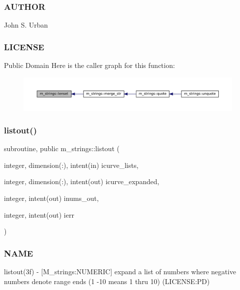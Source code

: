 \subsubsection*{A\+U\+T\+H\+OR}

John S. Urban \subsubsection*{L\+I\+C\+E\+N\+SE}

Public Domain Here is the caller graph for this function\+:
\nopagebreak
\begin{figure}[H]
\begin{center}
\leavevmode
\includegraphics[width=350pt]{namespacem__strings_a378563bb49f128bf0cf9c9d2b1f34498_icgraph}
\end{center}
\end{figure}
\mbox{\label{namespacem__strings_a81b4b7f4f301b9e17604adbcace58d0c}} 
\subsubsection{\texorpdfstring{listout()}{listout()}}
{\footnotesize\ttfamily subroutine, public m\+\_\+strings\+::listout (\begin{DoxyParamCaption}\item[{integer, dimension(\+:), intent(in)}]{icurve\+\_\+lists,  }\item[{integer, dimension(\+:), intent(out)}]{icurve\+\_\+expanded,  }\item[{integer, intent(out)}]{inums\+\_\+out,  }\item[{integer, intent(out)}]{ierr }\end{DoxyParamCaption})}



\subsubsection*{N\+A\+ME}

listout(3f) -\/ \mbox{[}M\+\_\+strings\+:N\+U\+M\+E\+R\+IC\mbox{]} expand a list of numbers where negative numbers denote range ends (1 -\/10 means 1 thru 10) (L\+I\+C\+E\+N\+SE\+:PD) 

